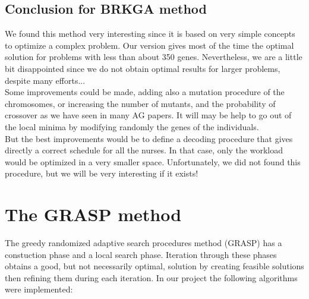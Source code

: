 \documentclass[11pt]{article}
\begin{document}
\subsection{Conclusion for BRKGA method}
We found this method very interesting since it is based on very simple concepts to optimize a complex problem. Our version gives most of the time the optimal solution for problems with less than about 350 genes. Nevertheless, we are a little bit disappointed since we do not obtain optimal results for larger problems, despite many efforts...  \\
Some improvements could be made, adding also a mutation procedure of the chromosomes, or increasing the number of mutants, and the probability of crossover as we have seen in many AG papers. It will may be help to go out of the local minima by modifying  randomly the genes of the individuals. \\
But the best improvements would be to define a decoding procedure that gives directly a correct schedule for all the nurses. In that case, only the workload would be optimized in a very smaller space. Unfortunately, we did not found this procedure, but we will be very interesting if it exists!



\section{The GRASP method}
The greedy randomized adaptive search procedures method (GRASP) has a constuction phase and a local search phase. Iteration through these phases obtains a good, but not necessarily optimal, solution by creating feasible solutions then refining them during each iteration.
In our project the following algorithms were implemented:\\
\end{document}
